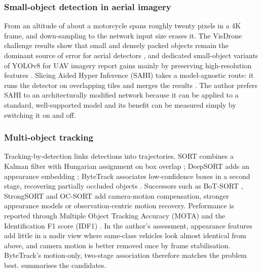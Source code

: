\subsubsection{Small-object detection in aerial imagery}
From an altitude of about  a motorcycle spans roughly twenty pixels in a 4K frame, and down-sampling to the
network input size erases it. The VisDrone challenge results show that small and densely packed objects remain
the dominant source of error for aerial detectors \cite{cao2021visdrone,zhu2022visdrone}, and dedicated
small-object variants of YOLOv8 for UAV imagery report gains mainly by preserving high-resolution features
\cite{wang2023uavyolov8}. Slicing Aided Hyper Inference (SAHI) takes a model-agnostic route: it runs the
detector on overlapping tiles and merges the results \cite{akyon2022sahi}. The author prefers SAHI to an
architecturally modified network because it can be applied to a standard, well-supported model and its benefit
can be measured simply by switching it on and off.

\subsubsection{Multi-object tracking}
Tracking-by-detection links detections into trajectories. SORT combines a Kalman filter with Hungarian
assignment on box overlap \cite{bewley2016sort}; DeepSORT adds an appearance embedding \cite{wojke2017deepsort};
ByteTrack associates low-confidence boxes in a second stage, recovering partially occluded objects
\cite{zhang2022bytetrack}. Successors such as BoT-SORT \cite{aharon2022botsort}, StrongSORT
\cite{du2023strongsort} and OC-SORT \cite{cao2023observation} add camera-motion compensation, stronger appearance
models or observation-centric motion recovery. Performance is reported through Multiple Object Tracking Accuracy
(MOTA) \cite{bernardin2008clearmot} and the Identification F1 score (IDF1) \cite{ristani2016idf1}. In the author's assessment, appearance
features add little in a nadir view where same-class vehicles look almost identical from above, and camera
motion is better removed once by frame stabilisation. ByteTrack's motion-only, two-stage association therefore
matches the problem best.  summarises the candidates.

